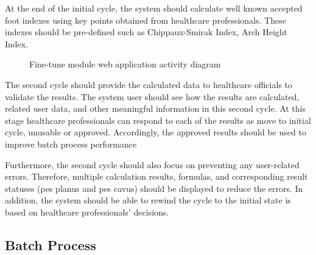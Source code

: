 At the end of the initial cycle, the system should calculate well known accepted foot indexes using key points obtained from healthcare professionals. These indexes should be pre-defined such as Chippaux-Smirak Index, Arch Height Index.

\begin{figure}[htbp]
\centering
{}
\caption{Fine-tune module web application activity diagram}
\label{fig:FineTuneModuleWebApplicationSequenceDiagram}
\end{figure}

The second cycle should provide the calculated data to healthcare officials to validate the results. The system user should see how the results are calculated, related user data, and other meaningful information in this second cycle. At this stage healthcare professionals can respond to each of the results as move to initial cycle, unusable or approved. Accordingly, the approved results should be used to improve batch process performance

Furthermore, the second cycle should also focus on preventing any user-related errors. Therefore, multiple calculation results, formulas, and corresponding result statuses (pes planus and pes cavus) should be displayed to reduce the errors. In addition, the system should be able to rewind the cycle to the initial state is based on healthcare professionals' decisions.

\subsection{ Batch Process }

